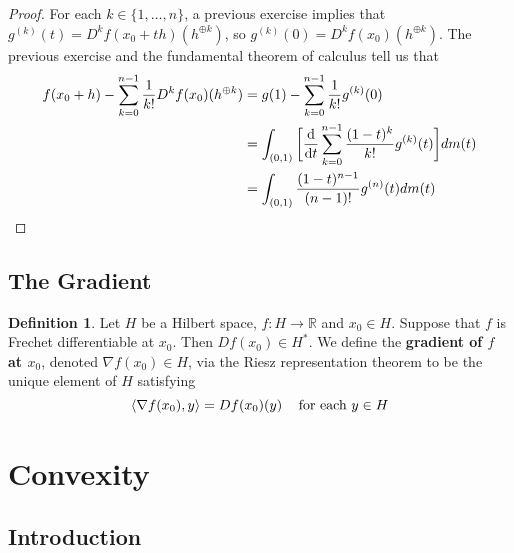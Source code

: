\documentclass[12pt]{amsart}
\theoremstyle{definition}
\newtheorem{defn}[definition]{Definition}
\theoremstyle{remark}
\theoremstyle{definition}
\newcommand{\R}{\mathbb{R}}
\renewcommand{\r}{\rangle}
\renewcommand{\l}{\langle}
\begin{document}
	\begin{proof}
	For each $k \in \{1, \dots, n\}$, a previous exercise implies that $g^{(k)}(t) = D^kf(x_0 + th)(h^{\oplus k})$, so $g^{(k)}(0) = D^kf(x_0)(h^{\oplus k})$. The previous exercise and the fundamental theorem of calculus tell us that 
	\begin{align*}
	f(x_0 +h) - \sum_{k=0}^{n-1} \frac{1}{k!}D^kf(x_0)(h^{\oplus k})
	&= g(1) - \sum_{k=0}^{n-1} \frac{1}{k!}g^{(k)}(0)\\
	&= \int_{(0,1)} \bigg [\dv{t} \sum_{k=0}^{n-1} \frac{(1-t)^k}{k!}g^{(k)}(t)\bigg ] dm(t) \\
	&= \int_{(0,1)} \frac{(1-t)^{n-1}}{(n-1)!}g^{(n)}(t) dm(t)
	\end{align*}	 
	\end{proof}
	
	

	
	
	
	
	
	\newpage
	\subsection{The Gradient}
	
	\begin{defn}
	Let $H$ be a Hilbert space, $f: H \rightarrow \R$ and $x_0 \in H$. Suppose that $f$ is Frechet differentiable at $x_0$. Then $Df(x_0) \in H^*$. We define the \textbf{gradient of $f$ at $x_0$}, denoted $\nabla f(x_0) \in H$, via the Riesz representation theorem to be the unique element of $H$ satisfying $$\l \nabla f(x_0), y \r = Df(x_0)(y) \hspace{.3cm} \text{ for each } y \in H$$
	\end{defn}
	
	
	
	
	
	
	
	
	
	
	

	
	
	
	
	
	
	\newpage
	\section{Convexity}
	
	\subsection{Introduction}
\end{document}
